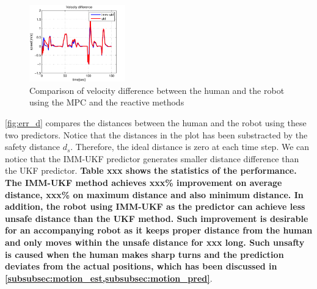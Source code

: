 \documentclass[letterpaper, 10 pt, conference]{ieeeconf}
\begin{document}
	\begin{figure}
		\centering
		\includegraphics[width=0.37\textwidth]{figures/vel_diff.pdf}
		\caption{Comparison of velocity difference between the human and the robot using the MPC and the reactive methods}
		\label{fig:err_v}
	\end{figure}
	\cref{fig:err_d} compares the distances between the human and the robot using these two predictors.
	Notice that the distances in the plot has been substracted by the safety distance $d_s$.
	Therefore, the ideal distance is zero at each time step.
	We can notice that the IMM-UKF predictor generates smaller distance difference than the UKF predictor.
	\textbf{Table xxx shows the statistics of the performance. The IMM-UKF method achieves xxx\% improvement on average distance, xxx\% on maximum distance and also minimum distance. In addition, the robot using IMM-UKF as the predictor can achieve less unsafe distance than the UKF method. Such improvement is desirable for an accompanying robot as it keeps proper distance from the human and only moves within the unsafe distance for xxx long. Such unsafty is caused when the human makes sharp turns and the prediction deviates from the actual positions, which has been discussed in \cref{subsubsec:motion_est,subsubsec:motion_pred}}.
\end{document}
